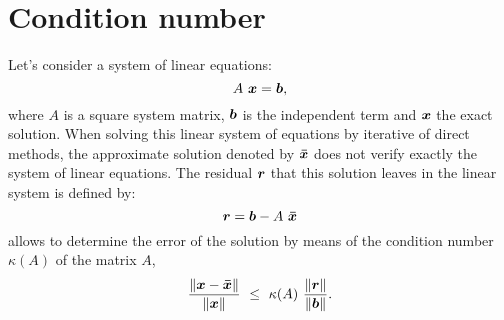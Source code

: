       \section{Condition number} 
      Let's consider a system of linear equations: 
       \begin{equation}
                A  \ \boldsymbol{x} = \boldsymbol{b},
                \label{LSE}
           \end{equation} 
      where $ A $ is a square system matrix,  $ \boldsymbol{b} $ is the independent 
      term and $ \boldsymbol{x}  $ the exact solution.  
      When solving this linear system of equations by iterative of direct 
      methods, the approximate solution denoted by  $  \boldsymbol{\bar x} $ does not 
      verify exactly the system of linear equations. 
      The residual $\boldsymbol{r} $  that this solution  leaves in the linear system 
      is defined by: 
        \begin{equation}
                    \boldsymbol{r} = \boldsymbol{b} - A \ \boldsymbol{ \bar x}
                    \label{residual}
           \end{equation} 
      allows to determine the error of the solution by means of the condition 
      number $\kappa(A)$ of the matrix $A$,  
       \begin{equation}
           \frac{\norm{ \boldsymbol{x} - \boldsymbol{\bar x}  }}{\norm{ \boldsymbol{x}}} \ \leq \
                \kappa(A) \
                \frac{\norm{ \boldsymbol{r}}}{\norm{\boldsymbol{b}}}.
                \label{error}
      \end{equation}
      
